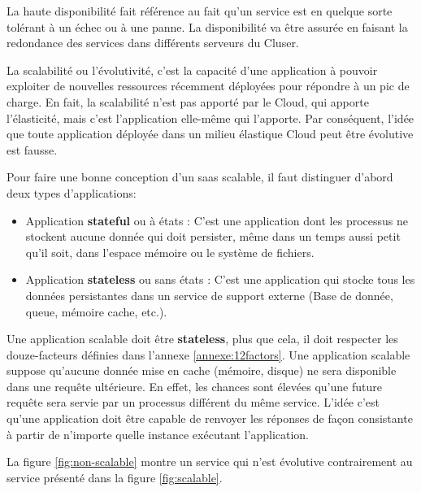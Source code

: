 \begin{onehalfspace}
La haute disponibilité fait référence au fait qu'un service est en quelque sorte tolérant à un échec ou à une panne. La disponibilité va être assurée en faisant la redondance des services dans différents serveurs du Cluser.

La scalabilité ou l'évolutivité, c'est la capacité d'une application à pouvoir exploiter de nouvelles ressources récemment déployées pour répondre à un pic de charge. En fait, la scalabilité n'est pas apporté par le Cloud, qui apporte l'élasticité, mais c'est l'application elle-même qui l'apporte. Par conséquent, l'idée que toute application déployée dans un milieu élastique Cloud peut être évolutive est fausse.


Pour faire une bonne conception d'un \acrshort{saas} scalable, il faut distinguer d'abord deux types d'applications:

\begin{itemize}
	\item Application \textbf{stateful} ou à états : C'est une application dont les processus ne stockent aucune donnée qui doit persister, même dans un temps aussi petit qu'il soit, dans l'espace mémoire ou le système de fichiers.
	\item Application \textbf{stateless} ou sans états : C'est une application qui stocke tous les données persistantes dans un service de support externe (Base de donnée, queue, mémoire cache, etc.).
\end{itemize}

Une application scalable doit être \textbf{stateless}, plus que cela, il doit respecter les douze-facteurs définies dans l'annexe \ref{annexe:12factors}. Une application scalable suppose qu'aucune donnée mise en cache (mémoire, disque) ne sera disponible dans une requête ultérieure. En effet, les chances sont élevées qu'une future requête sera servie par un processus différent du même service. L'idée c'est qu'une application doit être capable de renvoyer les réponses de façon consistante à partir de n'importe quelle instance exécutant l'application.



La figure \ref{fig:non-scalable} montre un service qui n'est évolutive contrairement au service présenté dans la figure \ref{fig:scalable}.



\end{onehalfspace}

